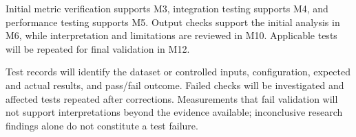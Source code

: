 Initial metric verification supports M3, integration testing supports M4, and performance testing supports M5. Output checks support the initial analysis in M6, while interpretation and limitations are reviewed in M10. Applicable tests will be repeated for final validation in M12.


Test records will identify the dataset or controlled inputs, configuration, expected and actual results, and pass/fail outcome. Failed checks will be investigated and affected tests repeated after corrections. Measurements that fail validation will not support interpretations beyond the evidence available; inconclusive research findings alone do not constitute a test failure.
